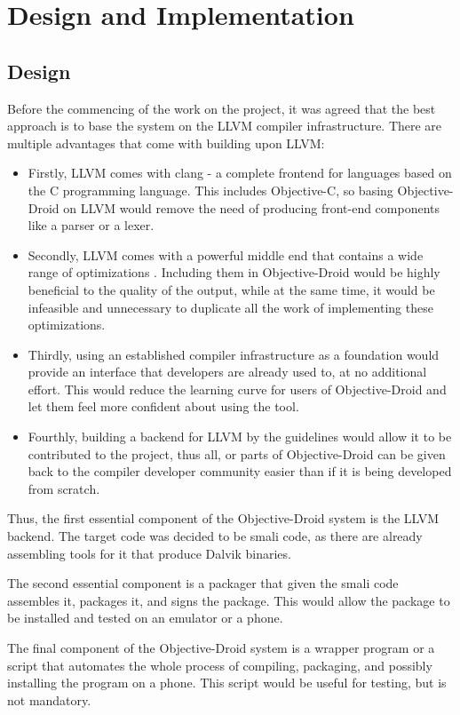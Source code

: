 \documentclass[parskip]{cs4rep}
\begin{document}
\chapter{Design and Implementation}

\section{Design}

Before the commencing of the work on the project, it was agreed that the best approach is to base the system on the LLVM compiler infrastructure. There are multiple advantages that come with building upon LLVM:
\begin{itemize}
\item
Firstly, LLVM comes with clang - a complete frontend for languages based on the C programming language. This includes Objective-C, so basing Objective-Droid on LLVM would remove the need of producing front-end components like a parser or a lexer.
\item
Secondly, LLVM comes with a powerful middle end that contains a wide range of optimizations \cite{P7}. Including them in Objective-Droid would be highly beneficial to the quality of the output, while at the same time, it would be infeasible and unnecessary to duplicate all the work of implementing these optimizations.
\item
Thirdly, using an established compiler infrastructure as a foundation would provide an interface that developers are already used to, at no additional effort. This would reduce the learning curve for users of Objective-Droid and let them feel more confident about using the tool.
\item
Fourthly, building a backend for LLVM by the guidelines would allow it to be contributed to the project, thus all, or parts of Objective-Droid can be given back to the compiler developer community easier than if it is being developed from scratch.
\end{itemize}
Thus, the first essential component of the Objective-Droid system is the LLVM backend. The target code was decided to be smali code, as there are already assembling tools for it that produce Dalvik binaries.

The second essential component is a packager that given the smali code assembles it, packages it, and signs the package. This would allow the package to be installed and tested on an emulator or a phone.

The final component of the Objective-Droid system is a wrapper program or a script that automates the whole process of compiling, packaging, and possibly installing the program on a phone. This script would be useful for testing, but is not mandatory.
\end{document}
